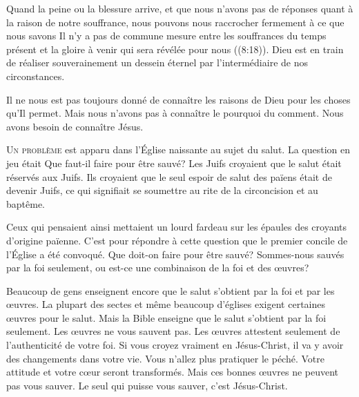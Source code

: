 Quand la peine ou la blessure arrive, 
 et que nous n'avons pas de réponses 
 quant à la raison de notre souffrance, nous pouvons nous raccrocher
 fermement à ce que nous savons\frcolon{}
 \Og Il n'y a pas de commune mesure entre les souffrances du temps présent
 et la gloire à venir qui sera révélée pour nous \Fg{} ((8:18)).
 Dieu est en train de réaliser souverainement un dessein éternel
 par l'intermédiaire de nos circonstances.

Il ne nous est pas toujours donné de connaître les raisons de Dieu
 pour les choses qu'Il permet. Mais nous n'avons pas à connaître
 le pourquoi du comment. Nous avons besoin de connaître Jésus.

\dvrule






\lettrine{U}{n problème} est apparu dans l'Église  naissante
 au sujet du salut. La question en jeu était\frcolon{} 
 \Og Que faut-il faire pour être sauvé? \Fg{}
 Les Juifs croyaient que le salut était réservés aux Juifs.
 Ils croyaient que le seul espoir de salut des païens était de devenir Juifs,
 ce qui signifiait se soumettre au rite de la circoncision et au baptême.

Ceux qui pensaient ainsi mettaient un lourd fardeau sur les épaules
 des croyants d'origine païenne. C'est pour répondre à cette question
 que le premier concile de l'Église a été convoqué. 
 Que doit-on faire pour être sauvé? Sommes-nous sauvés par la foi seulement,
 ou est-ce une combinaison de la foi et des \oe{}uvres?


Beaucoup de gens enseignent encore que le salut s'obtient par la foi
 et par les \oe{}uvres. La plupart des sectes et même beaucoup d'églises
 exigent certaines \oe{}uvres pour le salut.
 Mais la Bible enseigne que le salut s'obtient par la foi seulement.
 Les \oe{}uvres ne vous sauvent pas. Les \oe{}uvres attestent seulement
 de l'authenticité de votre foi. Si vous croyez vraiment en Jésus-Christ,
 il va y avoir des changements dans votre vie. Vous n'allez plus pratiquer
 le péché. Votre attitude et votre c\oe{}ur seront transformés.
 Mais ces bonnes \oe{}uvres ne peuvent pas vous sauver.
 Le seul qui puisse vous sauver, c'est Jésus-Christ.

